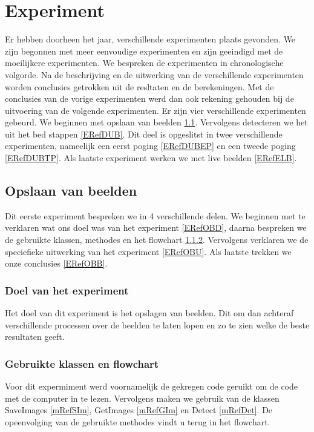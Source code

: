 \chapter{Experiment}
\label{ERef}
Er hebben doorheen het jaar, verschillende experimenten plaats gevonden. We zijn begonnen met meer eenvoudige experimenten en zijn geeindigd met de moeilijkere experimenten. We bespreken de experimenten in chronologische volgorde. Na de beschrijving en de uitwerking van de verschillende experimenten worden conclusies getrokken uit de resltaten en de berekeningen. Met de conclusies van de vorige experimenten werd dan ook rekening gehouden bij de uitvoering van de volgende experimenten. Er zijn vier verschillende experimenten gebeurd. We beginnen met opslaan van beelden \ref{ERefOvB}. Vervolgens detecteren we het uit het bed stappen \ref{ERefDUB}. Dit deel is opgeslitst in twee verschillende experimenten, nameelijk een eerst poging \ref{ERefDUBEP} en een tweede poging \ref{ERefDUBTP}. Als laatste experiment werken we met live beelden \ref{ERefELB}.

\section{Opslaan van beelden}
\label{ERefOvB}
Dit eerste experiment bespreken we in 4 verschillende delen. We beginnen met te verklaren wat ons doel was van het experiment \ref{ERefOBD}, daarna bespreken we de gebruikte klassen, methodes en het flowchart \ref{ERefOBF}. Vervolgens verklaren we de speciefieke uitwerking van het experiment \ref{ERefOBU}. Als laatste trekken we onze conclusies \ref{ERefOBB}.

\subsection{Doel van het experiment}
Het doel van dit experiment is het opslagen van beelden. Dit om dan achteraf verschillende processen over de beelden te laten lopen en zo te zien welke de beste resultaten geeft.
\label{ERefOBD}

\subsection{Gebruikte klassen en flowchart}
\label{ERefOBF}
Voor dit expermiment werd voornamelijk de gekregen code geruikt om de code met de computer in te lezen. Vervolgens maken we gebruik van de klassen SaveImages \ref{mRefSIm}, GetImages \ref{mRefGIm} en Detect \ref{mRefDet}. De opeenvolging van de gebruikte methodes vindt u terug in het flowchart. 

